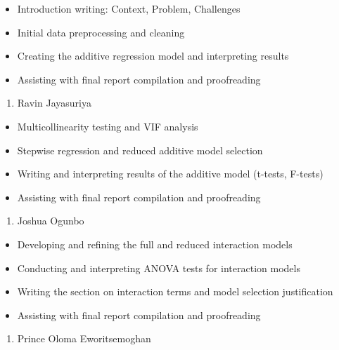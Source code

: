 \documentclass[
]{article}
\providecommand{\tightlist}{%
  \setlength{\itemsep}{0pt}\setlength{\parskip}{0pt}}
\begin{document}
\begin{itemize}
\tightlist
\item
  Introduction writing: Context, Problem, Challenges
\item
  Initial data preprocessing and cleaning
\item
  Creating the additive regression model and interpreting results
\item
  Assisting with final report compilation and proofreading
\end{itemize}

\begin{enumerate}
\def\labelenumi{\arabic{enumi}.}
\setcounter{enumi}{1}
\tightlist
\item
  Ravin Jayasuriya
\end{enumerate}

\begin{itemize}
\tightlist
\item
  Multicollinearity testing and VIF analysis
\item
  Stepwise regression and reduced additive model selection
\item
  Writing and interpreting results of the additive model (t-tests,
  F-tests)
\item
  Assisting with final report compilation and proofreading
\end{itemize}

\begin{enumerate}
\def\labelenumi{\arabic{enumi}.}
\setcounter{enumi}{2}
\tightlist
\item
  Joshua Ogunbo
\end{enumerate}

\begin{itemize}
\tightlist
\item
  Developing and refining the full and reduced interaction models
\item
  Conducting and interpreting ANOVA tests for interaction models
\item
  Writing the section on interaction terms and model selection
  justification
\item
  Assisting with final report compilation and proofreading
\end{itemize}

\begin{enumerate}
\def\labelenumi{\arabic{enumi}.}
\setcounter{enumi}{3}
\tightlist
\item
  Prince Oloma Eworitsemoghan
\end{enumerate}
\end{document}
